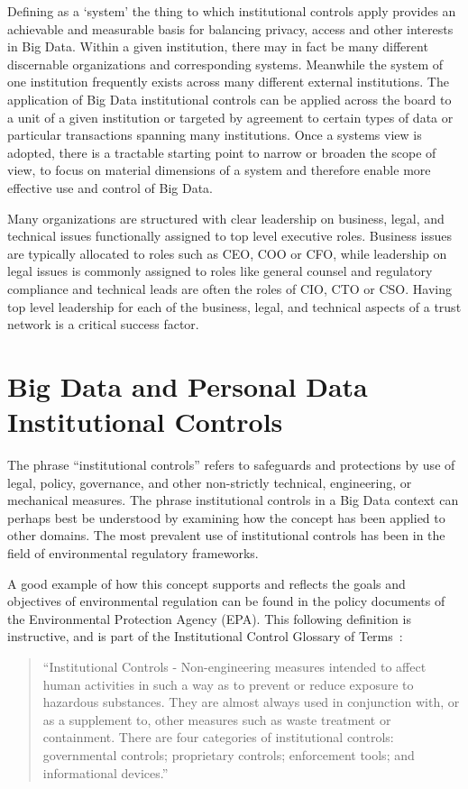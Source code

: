 Defining as a `system' the thing to which institutional controls apply provides an achievable and measurable basis for balancing privacy, access and other interests in Big Data.  Within a given institution, there may in fact be many different discernable organizations and corresponding systems.  Meanwhile the system of one institution frequently exists across many different external institutions.  The application of Big Data institutional controls can be applied across the board to a unit of a given institution or targeted by agreement to certain types of data or particular transactions spanning many institutions. Once a systems view is adopted, there is a tractable starting point to narrow or broaden the scope of view, to focus on material dimensions of a system and therefore enable more effective use and control of Big Data.


Many organizations are structured with clear leadership on business, legal, and technical issues functionally assigned to top level executive roles.  Business issues are typically allocated to roles such as CEO, COO or CFO, while leadership on legal issues is commonly assigned to roles like general counsel and regulatory compliance and technical leads are often the roles of CIO, CTO or CSO. Having top level leadership for each of the business, legal, and technical aspects of a trust network is a critical success factor. 


\section{Big Data and Personal Data Institutional Controls }

The phrase ``institutional controls'' refers to safeguards and protections by use of legal, policy, governance, and other non-strictly technical, engineering, or mechanical measures.
The phrase institutional controls in a Big Data context can perhaps best be understood by examining how the concept has been applied to other domains.
The most prevalent use of institutional controls has been in the field of environmental regulatory frameworks.

A good example of how this concept supports and reflects the goals and objectives of environmental regulation can be found in the policy documents of the Environmental Protection Agency (EPA).
This following definition is instructive, and is part of the Institutional Control Glossary of Terms~\cite{EPA2007}:
\begin{quote}
``Institutional Controls - Non-engineering measures intended to affect human activities in such a way as to prevent or reduce exposure to hazardous substances. They are almost always used in conjunction with, or as a supplement to, other measures such as waste treatment or containment. There are four categories of institutional controls: governmental controls; proprietary controls; enforcement tools; and informational devices.''
\end{quote}

